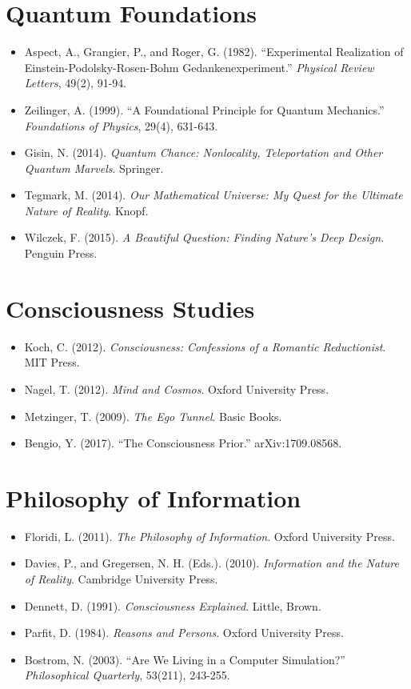 \documentclass[12pt]{article}
\providecommand{\tightlist}{\setlength{\itemsep}{0pt}\setlength{\parskip}{0pt}}
\begin{document}
\section{Quantum Foundations}\label{quantum-foundations}

\begin{itemize}
\tightlist
\item
  Aspect, A., Grangier, P., and Roger, G. (1982). ``Experimental
  Realization of Einstein-Podolsky-Rosen-Bohm Gedankenexperiment.''
  \emph{Physical Review Letters}, 49(2), 91-94.
\item
  Zeilinger, A. (1999). ``A Foundational Principle for Quantum
  Mechanics.'' \emph{Foundations of Physics}, 29(4), 631-643.
\item
  Gisin, N. (2014). \emph{Quantum Chance: Nonlocality, Teleportation and
  Other Quantum Marvels}. Springer.
\item
  Tegmark, M. (2014). \emph{Our Mathematical Universe: My Quest for the
  Ultimate Nature of Reality}. Knopf.
\item
  Wilczek, F. (2015). \emph{A Beautiful Question: Finding Nature's Deep
  Design}. Penguin Press.
\end{itemize}

\section{Consciousness Studies}\label{consciousness-studies}

\begin{itemize}
\tightlist
\item
  Koch, C. (2012). \emph{Consciousness: Confessions of a Romantic
  Reductionist}. MIT Press.
\item
  Nagel, T. (2012). \emph{Mind and Cosmos}. Oxford University Press.
\item
  Metzinger, T. (2009). \emph{The Ego Tunnel}. Basic Books.
\item
  Bengio, Y. (2017). ``The Consciousness Prior.'' arXiv:1709.08568.
\end{itemize}

\section{Philosophy of
Information}\label{philosophy-of-information}

\begin{itemize}
\tightlist
\item
  Floridi, L. (2011). \emph{The Philosophy of Information}. Oxford
  University Press.
\item
  Davies, P., and Gregersen, N. H. (Eds.). (2010). \emph{Information and
  the Nature of Reality}. Cambridge University Press.
\item
  Dennett, D. (1991). \emph{Consciousness Explained}. Little, Brown.
\item
  Parfit, D. (1984). \emph{Reasons and Persons}. Oxford University
  Press.
\item
  Bostrom, N. (2003). ``Are We Living in a Computer Simulation?''
  \emph{Philosophical Quarterly}, 53(211), 243-255.
\end{itemize}
\end{document}
